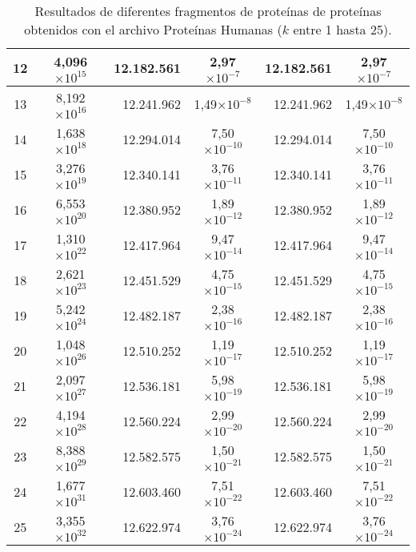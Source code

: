 \begin{table}[!hbt]
\begin{tabular}{| c  r  r  c  r  c |}
    12 & \multicolumn{1}{c}{4,096$\times 10^{15}$} & 12.182.561 & 2,97$\times 10^{-7}$ & 12.182.561 & 2,97$\times 10^{-7}$ \\ \hline  
    13 & \multicolumn{1}{c}{8,192$\times 10^{16}$} & 12.241.962 & 1,49$\times 10^{-8}$ & 12.241.962 & 1,49$\times 10^{-8}$ \\ \hline
    14 & \multicolumn{1}{c}{1,638$\times 10^{18}$} & 12.294.014 & 7,50$\times 10^{-10}$ & 12.294.014 & 7,50$\times 10^{-10}$ \\ \hline  
    15 & \multicolumn{1}{c}{3,276$\times 10^{19}$} & 12.340.141 & 3,76$\times 10^{-11}$ & 12.340.141 & 3,76$\times 10^{-11}$ \\ \hline
    16 & \multicolumn{1}{c}{6,553$\times 10^{20}$} & 12.380.952 & 1,89$\times 10^{-12}$ & 12.380.952 & 1,89$\times 10^{-12}$ \\ \hline  
    17 & \multicolumn{1}{c}{1,310$\times 10^{22}$} & 12.417.964 & 9,47$\times 10^{-14}$ & 12.417.964 & 9,47$\times 10^{-14}$ \\ \hline
    18 & \multicolumn{1}{c}{2,621$\times 10^{23}$} & 12.451.529 & 4,75$\times 10^{-15}$ & 12.451.529 & 4,75$\times 10^{-15}$ \\ \hline  
    19 & \multicolumn{1}{c}{5,242$\times 10^{24}$} & 12.482.187 & 2,38$\times 10^{-16}$ & 12.482.187 & 2,38$\times 10^{-16}$ \\ \hline
    20 & \multicolumn{1}{c}{1,048$\times 10^{26}$} & 12.510.252 & 1,19$\times 10^{-17}$ & 12.510.252 & 1,19$\times 10^{-17}$ \\ \hline  
    21 & \multicolumn{1}{c}{2,097$\times 10^{27}$} & 12.536.181 & 5,98$\times 10^{-19}$ & 12.536.181 & 5,98$\times 10^{-19}$ \\ \hline
    22 & \multicolumn{1}{c}{4,194$\times 10^{28}$} & 12.560.224 & 2,99$\times 10^{-20}$ & 12.560.224 & 2,99$\times 10^{-20}$ \\ \hline  
    23 & \multicolumn{1}{c}{8,388$\times 10^{29}$} & 12.582.575 & 1,50$\times 10^{-21}$ & 12.582.575 & 1,50$\times 10^{-21}$ \\ \hline
    24 & \multicolumn{1}{c}{1,677$\times 10^{31}$} & 12.603.460 & 7,51$\times 10^{-22}$ & 12.603.460 & 7,51$\times 10^{-22}$ \\ \hline  
    25 & \multicolumn{1}{c}{3,355$\times 10^{32}$} & 12.622.974 & 3,76$\times 10^{-24}$ & 12.622.974 & 3,76$\times 10^{-24}$ \\ \hline        
    \end{tabular}
    \caption{Resultados de diferentes fragmentos de proteínas de proteínas obtenidos con el archivo Proteínas Humanas ($k$ entre 1 hasta 25).}
    \label{tb:label41}
\end{table}

